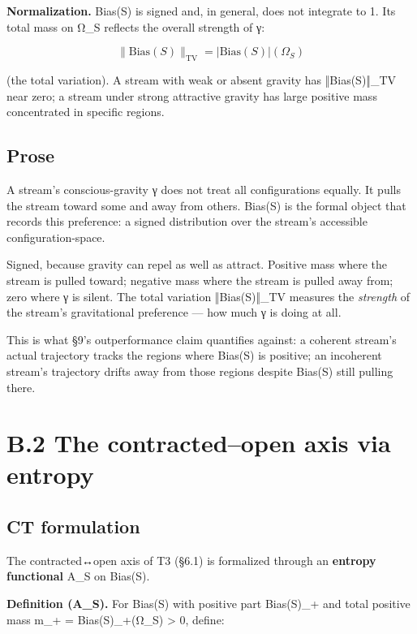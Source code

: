 \documentclass[11pt, openany]{book}
\newcommand{\sectionbreak}{\clearpage}
\begin{document}
\textbf{Normalization.} Bias(S) is signed and, in general, does not integrate to 1. Its total mass on Ω\_\allowbreak{}S reflects the overall strength of γ:

$$\|\text{Bias}(S)\|_{\text{TV}} = |\text{Bias}(S)|(\Omega_S)$$

(the total variation). A stream with weak or absent gravity has ‖Bias(S)‖\_\allowbreak{}TV near zero; a stream under strong attractive gravity has large positive mass concentrated in specific regions.

\subsection{Prose}

A stream's conscious-gravity γ does not treat all configurations equally. It pulls the stream toward some and away from others. Bias(S) is the formal object that records this preference: a signed distribution over the stream's accessible configuration-space.

Signed, because gravity can repel as well as attract. Positive mass where the stream is pulled toward; negative mass where the stream is pulled away from; zero where γ is silent. The total variation ‖Bias(S)‖\_\allowbreak{}TV measures the \textit{strength} of the stream's gravitational preference --- how much γ is doing at all.

This is what §9's outperformance claim quantifies against: a coherent stream's actual trajectory tracks the regions where Bias(S) is positive; an incoherent stream's trajectory drifts away from those regions despite Bias(S) still pulling there.

\sectionbreak

\section{B.2 The contracted–open axis via entropy}

\subsection{CT formulation}

The contracted↔open axis of T3 (§6.1) is formalized through an \textbf{entropy functional} A\_\allowbreak{}S on Bias(S).

\textbf{Definition (A\_\allowbreak{}S).} For Bias(S) with positive part Bias(S)\_\allowbreak{}+ and total positive mass m\_\allowbreak{}+ = Bias(S)\_\allowbreak{}+(Ω\_\allowbreak{}S) > 0, define:
\end{document}
